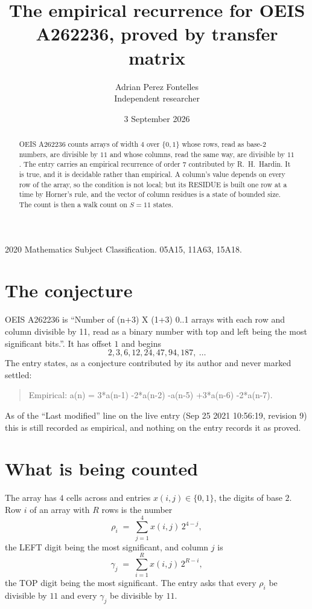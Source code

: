 \documentclass[11pt,a4paper]{article}
\title{The empirical recurrence for OEIS A262236, proved by transfer matrix}
\author{Adrian Perez Fontelles\\ \small Independent researcher}
\date{3 September 2026}
\theoremstyle{plain}
\theoremstyle{definition}
\begin{document}
\maketitle

\begin{abstract}
OEIS A262236 counts arrays of width $4$ over $\{0,1\}$ whose rows, read as base-$2$
numbers, are divisible by $11$ and whose columns, read the same way, are divisible by
$11$. The entry carries an empirical recurrence of order $7$ contributed by
R.~H.~Hardin. It is true, and it is decidable rather than empirical. A column's value depends on
every row of the array, so the condition is not local; but its RESIDUE is built one row at a
time by Horner's rule, and the vector of column residues is a state of bounded size. The count
is then a walk count on $S=11$ states.
\end{abstract}

\noindent\small 2020 Mathematics Subject Classification. 05A15, 11A63, 15A18.\normalsize

\section{The conjecture}

OEIS A262236 is ``Number of (n+3) X (1+3) 0..1 arrays with each row and column divisible by 11, read as a binary number with top and left being the most significant bits.''. It has offset $1$ and begins
\[
2, 3, 6, 12, 24, 47, 94, 187,\ \dots
\]
The entry states, as a conjecture contributed by its author and never marked settled:
\begin{quote}
Empirical: a(n) = 3*a(n-1) -2*a(n-2) -a(n-5) +3*a(n-6) -2*a(n-7).
\end{quote}
As of the ``Last modified'' line on the live entry (Sep 25 2021 10:56:19, revision 9) this is still
recorded as empirical, and nothing on the entry records it as proved.

\section{What is being counted}

The array has $4$ cells across and entries $x(i,j)\in\{0,1\}$, the digits of
base $2$. Row $i$ of an array with $R$ rows is the number
\[
\rho_i\;=\;\sum_{j=1}^{4}x(i,j)\,2^{4-j} ,
\]
the LEFT digit being the most significant, and column $j$ is
\[
\gamma_j\;=\;\sum_{i=1}^{R}x(i,j)\,2^{R-i} ,
\]
the TOP digit being the most significant. The entry asks that every $\rho_i$ be divisible by
$11$ and every $\gamma_j$ be divisible by $11$.
\end{document}

